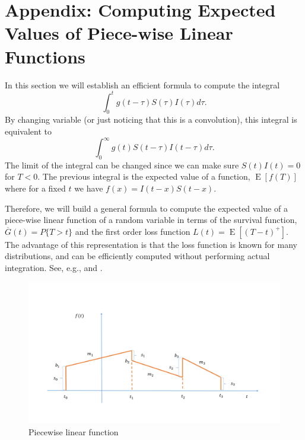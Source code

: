 \documentclass[USenglish,10pt]{article}
\newcommand{\eg}{e.g.\xspace}
\newcommand{\Gb}{\overline{G}\xspace}
\DeclareMathOperator{\Exp}{E}       %
\newcommand{\E}[1]{\Exp\left[{#1}\right]}       %
\begin{document}
\appendix

\section{Appendix: Computing Expected Values of Piece-wise Linear Functions} \label{app:piecewise}

In this section we will establish an efficient formula to compute the integral
\[ \int_0^{t} g(t-\tau) S(\tau)I(\tau)d\tau.  \]
By changing variable (or just noticing that this is a convolution), this integral is equivalent to
\[  \int_0^{\infty} g(t) S(t-\tau)I(t-\tau)d\tau.  \]
The limit of the integral can be changed since we can make sure $S(t)I(t)=0$ for $T<0$. The previous integral is the expected value of a function, $\E{f(T)}$ where for a fixed $t$ we have $f(x)=I(t-x)S(t-x)$.

Therefore, we will build a general formula to compute the expected value of a piece-wise linear function of a random variable in terms  of the survival function, $\Gb(t) = P\{T >t\}$ and the first order loss function $L(t)=\E{(T-t)^+}$.
The advantage of this representation is that the loss function is known for many distributions, and can be efficiently computed without performing actual integration. See, \eg, \cite[Page 14]{burn.ea.10} and \cite[Appendix C]{zipk00}.

\begin{figure}[ht]
    \centering
    \includegraphics[width=.6\textwidth]{figures/piecewise}
    \caption{Piecewise linear function}
    \label{fg:piecewise}
\end{figure}
\end{document}
